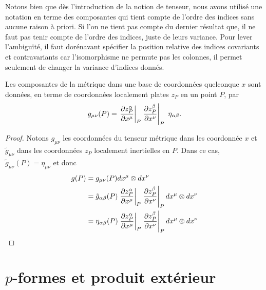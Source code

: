 \documentclass[a4paper,11pt]{report}
\begin{document}
                Notons bien que dès l'introduction de la notion de tenseur, nous avons utilisé une notation en terme des composantes qui tient compte de l'ordre des indices sans aucune raison à priori. Si l'on ne tient pas compte du dernier résultat que, il ne faut pas tenir compte de l'ordre des indices, juste de leurs variance. Pour lever l'ambiguïté, il faut dorénavant spécifier la position relative des indices covariants et contravariants car l'isomorphisme ne permute pas les colonnes, il permet seulement de changer la variance d'indices donnés.
                
                \begin{prop}
                \begin{leftbar}
                    Les composantes de la métrique dans une base de coordonnées quelconque $x$ sont données, en terme de coordonnées localement plates $z_P$ en un point $P$, par 
                    \begin{equation}
                        g_{\mu\nu}(P) = \eval{\pdv{z^\alpha_P}{x^\mu}}_{P}\eval{\pdv{z^\beta_P}{x^\nu}}_{P}~\eta_{\alpha\beta}.
                    \end{equation}
                \end{leftbar}
                \end{prop}
                
                \begin{proof}
                    Notons $g_{\mu\nu}$ les coordonnées du tenseur métrique dans les coordonnée $x$ et $\tilde{g}_{\mu\nu}$ dans les coordonnées $z_P$ localement inertielles en $P$. Dans ce cas, $\tilde{g}_{\mu\nu}(P) = \eta_{\mu\nu}$ et donc
                    \begin{align}
                        g(P) &= g_{\mu\nu}(P)dx^\mu\otimes dx^\nu \\
                        &= \tilde{g}_{\alpha\beta}(P) \eval{\pdv{z^\alpha_P}{x^\mu}}_{P}\eval{\pdv{z^\beta_P}{x^\nu}}_{P} dx^\mu\otimes dx^\nu\\
                        &= \eta_{\alpha\beta}(P) \eval{\pdv{z^\alpha_P}{x^\mu}}_{P}\eval{\pdv{z^\beta_P}{x^\nu}}_{P} dx^\mu\otimes dx^\nu
                    \end{align}
                \end{proof}
        
        \section{$p$-formes et produit extérieur}
        
\end{document}
